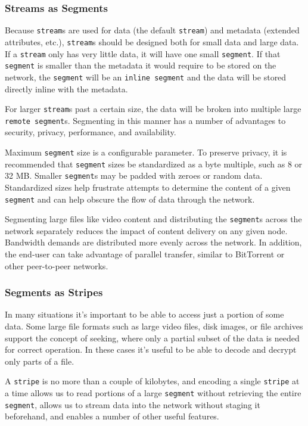 \documentclass[a4paper,10pt]{article} \usepackage[utf8]{inputenc}
\newcommand{\x}[1]{{\tt #1}} \newcommand{\code}[1]{{\tt #1}}
\begin{document}
\subsubsection{Streams as Segments}

Because \x{stream}s are used for data (the default \x{stream}) and metadata
(extended attributes, etc.), \x{stream}s should be designed both for small data
and large data. If a \x{stream} only has very little data, it will have one
small \x{segment}. If that \x{segment} is smaller than the metadata it would
require to be stored on the network, the \x{segment} will be an \x{inline
segment} and the data will be stored directly inline with the metadata.

For larger \x{stream}s past a certain size, the data will be broken into
multiple large \x{remote segment}s. Segmenting in this manner has a number of
advantages to security, privacy, performance, and availability.

Maximum \x{segment} size is a configurable parameter. To preserve privacy, it is
recommended that \x{segment} sizes be standardized as a byte multiple, such as 8
or 32 MB. Smaller \x{segment}s may be padded with zeroes or random data.
Standardized sizes help frustrate attempts to determine the content of a given
\x{segment} and can help obscure the flow of data through the network.

Segmenting large files like video content and distributing the \x{segment}s
across the network separately reduces the impact of content delivery on any
given node. Bandwidth demands are distributed more evenly across the network. In
addition, the end-user can take advantage of parallel transfer, similar to
BitTorrent \cite{24} or other peer-to-peer networks.

\subsubsection{Segments as Stripes}

In many situations it's important to be able to access just a portion of some
data. Some large file formats such as large video files, disk images, or file
archives support the concept of seeking, where only a partial subset of the data
is needed for correct operation. In these cases it's useful to be able to decode
and decrypt only parts of a file.

A \x{stripe} is no more than a couple of kilobytes, and encoding a single
\x{stripe} at a time allows us to read portions of a large \x{segment}
without retrieving the entire \x{segment}, allows us to stream data into the
network without staging it beforehand, and enables a number of other useful
features.
\end{document}
